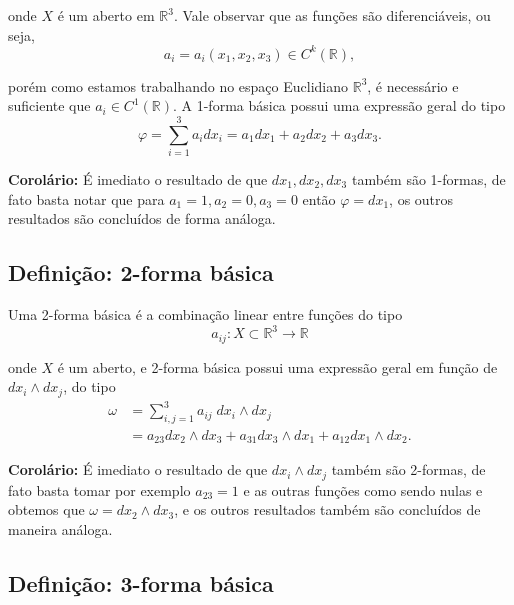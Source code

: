 onde $X$ é um aberto em $\mathbb{R}^3$. Vale observar que as funções são diferenciáveis, ou seja, 
%
\begin{equation}
a_i = a_i(x_1,x_2,x_3) \in C^{k}(\mathbb{R}),    
\end{equation}

porém como estamos trabalhando no espaço Euclidiano $\mathbb{R}^3$, é necessário e suficiente que $a_i \in C^{1}(\mathbb{R})$. A 1-forma básica possui uma expressão geral do tipo
%
\begin{equation}
\varphi = \sum_{i = 1}^{3}a_i dx_i 
= a_1  dx_1 + a_2  dx_2 + a_3  dx_3.
\end{equation}

\noindent\textbf{Corolário:} 
É imediato o resultado de que $dx_1, dx_2, dx_3$ também são 1-formas, de fato basta notar que para $a_1 = 1, a_2 = 0, a_3 = 0$ então $\varphi = dx_1$, os outros resultados são concluídos de forma análoga. 



\subsection{Definição: 2-forma básica}

\hspace{0.5cm}
Uma 2-forma básica é a combinação linear entre funções do tipo
%
\begin{equation}
a_{ij}: X \subset \mathbb{R}^3 \to \mathbb{R}    
\end{equation}

onde $X$ é um aberto, e 2-forma básica possui uma expressão geral em função de  $dx_i \wedge dx_j$, do tipo
%
\begin{align}
\nonumber 
\omega &= \sum_{i,j = 1}^{3} a_{ij} \; dx_i \wedge dx_j 
\\
&= a_{23} dx_2 \wedge dx_3 + a_{31} dx_3 \wedge dx_1 
+ a_{12} dx_1 \wedge dx_2.
\end{align}

\noindent\textbf{Corolário:} 
É imediato o resultado de que $dx_i \wedge dx_j$ também são 2-formas, de fato basta tomar por exemplo $a_{23} = 1$ e as outras funções como sendo nulas e obtemos que $\omega = dx_2 \wedge dx_3$, e os outros resultados também são concluídos de maneira análoga.



\subsection{Definição: 3-forma básica} 


